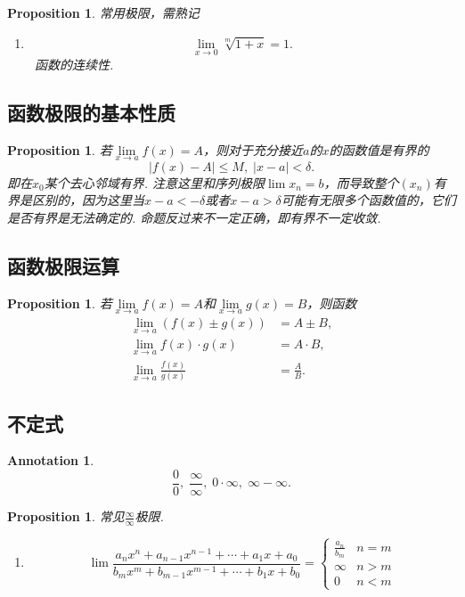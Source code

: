 \documentclass{article}
\newtheorem{proposition}[theorem]{Proposition}
\newtheorem{annotation}[theorem]{Annotation}
\newcommand{\hints}{{\color{blue} \text{hints}}}
\begin{document}
\begin{proposition}
\rm {\color{red}常用极限，需熟记}
\begin{enumerate}
	\item 
	$$
	\lim\limits_{x \rightarrow 0} \sqrt[m]{1+x} = 1.
	$$
	\hints\ 函数的连续性.
\end{enumerate}
\end{proposition}

\subsection{函数极限的基本性质}

\begin{proposition}
\rm 若$\lim\limits_{x \rightarrow a} f(x) = A$，则对于充分接近$a$的$x$的函数值是有界的
$$
|f(x)-A| \leq M ,\; |x-a| < \delta.
$$
即在$x_0$某个去心邻域有界. {\color{blue} 注意这里和序列极限$\lim x_n = b$，而导致整个$(x_n)$有界是区别的，因为这里当$x-a < -\delta$或者$x-a > \delta$可能有无限多个函数值的，它们是否有界是无法确定的}. {\color{red} 命题反过来不一定正确，即有界不一定收敛}.
\end{proposition}

\subsection{函数极限运算}

\begin{proposition}
\rm 若$\lim\limits_{x \rightarrow a} f(x) = A$和$\lim\limits_{x \rightarrow a} g(x) = B$，则函数
$$
\begin{array}{ll}
\lim\limits_{x \rightarrow a} (f(x) \pm  g(x)) &= A \pm B,\\
\lim\limits_{x \rightarrow a} f(x) \cdot g(x) & = A\cdot B, \\
\lim\limits_{x \rightarrow a} \frac{f(x)}{g(x)} &= \frac{A}{B}.
\end{array}
$$
\end{proposition}

\subsection{不定式}

\begin{annotation}
$$
\frac{0}{0},\; \frac{\infty}{\infty},\; 0\cdot \infty,\; \infty-\infty.
$$
\end{annotation}

\begin{proposition}
\rm {\color{red}常见$\frac{\infty}{\infty}$极限}.
\begin{enumerate}
	\item
	$$
		\lim \frac{a_nx^{n} + a_{n-1}x^{n-1} + \cdots + a_1x + a_0}{b_mx^{m} + b_{m-1}x^{m-1} + \cdots + b_1x + b_0} = \left\{ \begin{array}{ll}
		\frac{a_n}{b_m} & n=m \\
		\infty & n > m \\
		0 & n < m 
\end{array} \right.
	$$
\end{enumerate}
\end{proposition}
\end{document}
